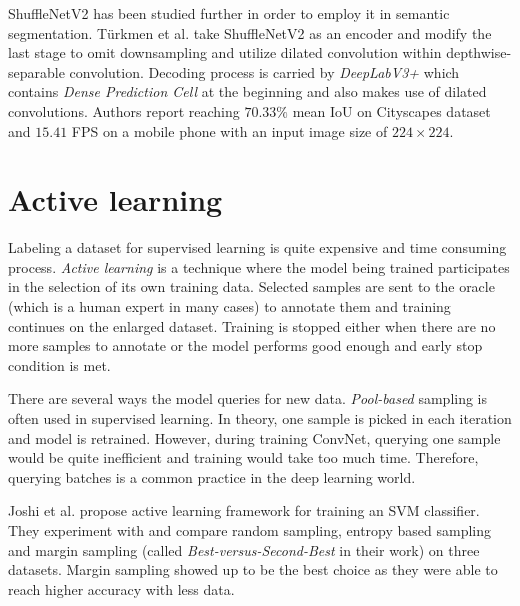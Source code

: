 ShuffleNetV2 has been studied further in order to employ it in semantic segmentation.
T{\"u}rkmen et al. \cite{bib:turkmen2019efficient} take ShuffleNetV2 as
an encoder and modify the last stage to omit downsampling and utilize dilated
convolution within depthwise-separable convolution. Decoding process is carried by
\textit{DeepLabV3+} \cite{bib:chen2018encoder} which contains
\textit{Dense Prediction Cell} \cite{bib:chen2018searching} at the beginning and
also makes use of dilated convolutions.
Authors report reaching $70.33\%$ mean IoU on Cityscapes dataset and $15.41$ FPS
on a mobile phone with an input image size of $224\times 224$.

\section{Active learning}
\label{sec:active_learning_rw}

Labeling a dataset for supervised learning is quite expensive and time consuming process.
\textit{Active learning} \cite{bib:settles2009active} 
is a technique where the model being trained participates in
the selection of its own training data. Selected samples are sent to the oracle (which
is a human expert in many cases) to annotate them and training continues on the enlarged
dataset. Training is stopped either when there are no more samples to annotate or the model
performs good enough and early stop condition is met. \cite{bib:sorsater2018}

There are several ways the model queries for new data. \textit{Pool-based} sampling is often used
in supervised learning. In theory, one sample is picked in each iteration and model is retrained.
However, during training ConvNet, querying one sample would be quite inefficient and
training would take
too much time. Therefore, querying batches is a common practice in the deep learning world.
\cite{bib:joshi2009multi, bib:vezhnevets2012active, bib:wang2016cost, bib:gal2017deep, bib:sener2017active, bib:yang2017suggestive, bib:mackowiak2018cereals, bib:zhdanov2019diverse}

\vspace{5mm}
Joshi et al. \cite{bib:joshi2009multi} propose active learning framework for training an
SVM classifier. They experiment with and compare random sampling, entropy based sampling
and margin sampling (called \textit{Best-versus-Second-Best} in their work) on three datasets.
Margin sampling showed up to be the best choice as they were able to reach higher accuracy with less
data.

